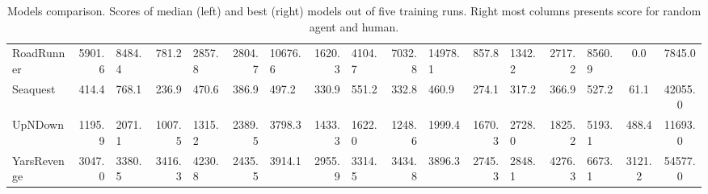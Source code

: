 \begin{landscape}
\begin{changemargin}{0cm}{0cm}
\begin{center}
\begin{table}[!htbp]
\begin{tabular}{l|rl|rl|rl|rl|rl|rl|rl|c|c}
RoadRunner     &   5901.6 &   8484.4 &    781.2 &   2857.8 &   2804.7 &  10676.6 &   1620.3 &   4104.7 &   7032.8 &  14978.1 &    857.8 &   1342.2 &   2717.2 &   8560.9 &      0.0 &   7845.0 \\
Seaquest       &    414.4 &    768.1 &    236.9 &    470.6 &    386.9 &    497.2 &    330.9 &    551.2 &    332.8 &    460.9 &    274.1 &    317.2 &    366.9 &    527.2 &     61.1 &  42055.0 \\
UpNDown        &   1195.9 &   2071.1 &   1007.5 &   1315.2 &   2389.5 &   3798.3 &   1433.3 &   1622.0 &   1248.6 &   1999.4 &   1670.3 &   2728.0 &   1825.2 &   5193.1 &    488.4 &  11693.0 \\
YarsRevenge    &   3047.0 &   3380.5 &   3416.3 &   4230.8 &   2435.5 &   3914.1 &   2955.9 &   3314.5 &   3434.8 &   3896.3 &   2745.3 &   2848.1 &   4276.3 &   6673.1 &   3121.2 &  54577.0 \\
\end{tabular}
\caption{Models comparison. Scores of median (left) and best (right) models out of five training runs. Right most columns presents score for random agent and human.}
\label{tab:minmax}
\end{table}
\vspace*{\fill}
\end{center}
\end{changemargin}
\end{landscape}
